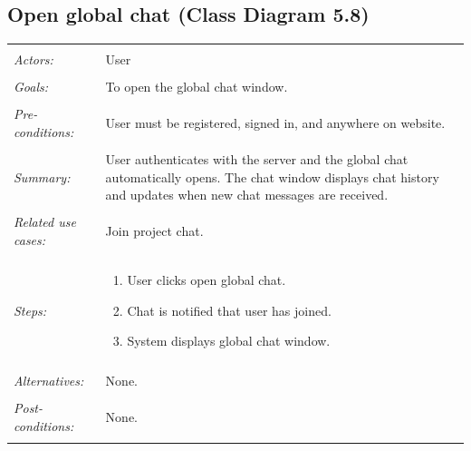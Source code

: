 \documentclass[11pt]{report}
\begin{document}
\subsection{Open global chat (Class Diagram 5.8)}
\begin{tabular}{ p{2cm} p{12cm} }
 \hline
 \\
 \textit{Actors:} & User \\ 
 \\
 \textit{Goals:} & To open the global chat window. \\
 \\
 \textit{Pre-conditions:} & User must be registered, signed in, and anywhere on website.  \\
 \\
 \textit{Summary:} & User authenticates with the server and the global chat automatically opens. The chat window displays chat history and updates when new chat messages are received.  \\ 
 \\
 \textit{Related use cases:} & Join project chat. \\ 
 \\
 \textit{Steps:} & \begin{enumerate}
  \item User clicks open global chat.
  \item Chat is notified that user has joined.
  \item System displays global chat window.
 \end{enumerate} \\
 \\
 \textit{Alternatives:} & None. \\
 \\
 \textit{Post-conditions:} & None. \\
 \\
\hline
\end{tabular}
\end{document}
